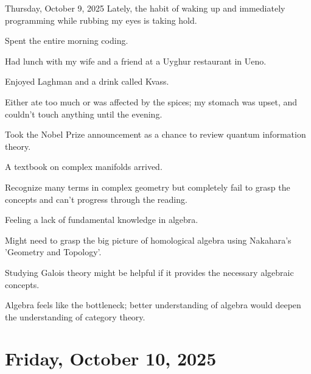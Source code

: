 \documentclass[dvipdfmx, autodetect-engine, aspectratio=169, 10.5pt]{beamer}
\begin{document}
\begin{frame}{Thursday, October 9, 2025}
	\scriptsize
	Lately, the habit of waking up and immediately programming while rubbing my eyes is taking hold.

	Spent the entire morning coding.

	Had lunch with my wife and a friend at a Uyghur restaurant in Ueno.

	Enjoyed Laghman and a drink called Kvass.

	Either ate too much or was affected by the spices; my stomach was upset, and couldn't touch anything until the evening.

	Took the Nobel Prize announcement as a chance to review quantum information theory.

	A textbook on complex manifolds arrived.

	Recognize many terms in complex geometry but completely fail to grasp the concepts and can't progress through the reading.

	Feeling a lack of fundamental knowledge in algebra.

	Might need to grasp the big picture of homological algebra using Nakahara's 'Geometry and Topology'.

	Studying Galois theory might be helpful if it provides the necessary algebraic concepts.

	Algebra feels like the bottleneck; better understanding of algebra would deepen the understanding of category theory.
\end{frame}

\section{Friday, October 10, 2025}
\end{document}
